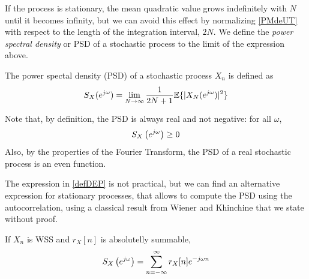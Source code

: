 If the process is stationary, the mean quadratic value grows indefinitely with $N$ until it becomes infinity, but we can avoid this effect by normalizing \eqref{PMdeUT} with respect to the length of the integration interval, $2N$. We define the \textsl{power spectral density} or
PSD of a stochastic process to the limit of the expression above.

\begin{definition}
The power spectal density (PSD) of a stochastic process $X_n$ is defined as
\begin{equation}
S_X(e^{j \omega}) = \lim_{N \rightarrow \infty} \frac{1}{2N+1} \mathbb{E}\{|X_N(e^{j \omega})|^2\}
\label{defDEP}
\end{equation}
\end{definition}

Note that, by definition, the PSD is always real and not negative:
for all $\omega$,
\begin{equation}
S_X\left(e^{j \omega}\right) \ge 0
\end{equation}
Also, by the properties of the Fourier Transform, the PSD of a real stochastic process is an even function.

The expression in \eqref{defDEP} is not practical, but we can find an alternative expression for stationary processes, that allows to compute the PSD using the autocorrelation, using a classical result from Wiener and Khinchine that we state without proof.

\begin{theorem}

If $X_n$ is WSS and $r_X[n]$ is absolutelly summable, 
\begin{equation}
S_X\left(e^{j \omega}\right) = \sum_{n=-\infty}^{\infty} r_X[n] e^{-j \omega n}
\label{DEPEst}
\end{equation}

\end{theorem}

